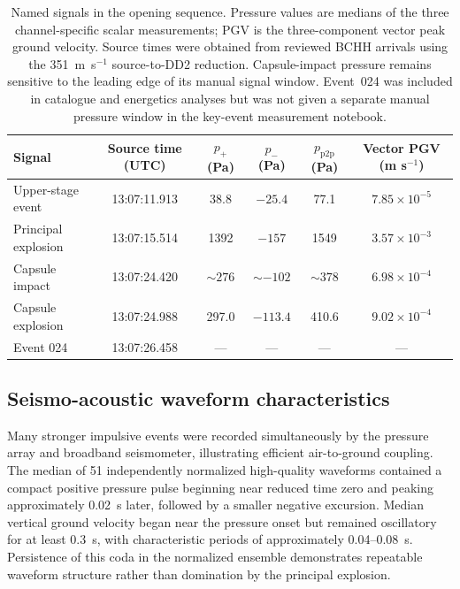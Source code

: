 \documentclass[]{seismica}
\begin{document}
\begin{table}[t]
\caption{Named signals in the opening sequence. Pressure values are medians of
the three channel-specific scalar measurements; PGV is the three-component
vector peak ground velocity. Source times were obtained from reviewed BCHH
arrivals using the 351~m~s$^{-1}$ source-to-DD2 reduction. Capsule-impact
pressure remains sensitive to the leading edge of its manual signal window.
Event~024 was included in catalogue and energetics analyses but was not given a
separate manual pressure window in the key-event measurement notebook.}
\label{tab:principal_events}
\centering
\small
\begin{tabular}{lccccc}
\hline
Signal & Source time (UTC) & $p_+$ (Pa) & $p_-$ (Pa) & $p_{\mathrm{p2p}}$ (Pa) & Vector PGV (m s$^{-1}$) \\
\hline
Upper-stage event & 13:07:11.913 & 38.8 & $-25.4$ & 77.1 & $7.85\times10^{-5}$ \\
Principal explosion & 13:07:15.514 & 1392 & $-157$ & 1549 & $3.57\times10^{-3}$ \\
Capsule impact & 13:07:24.420 & $\sim276$ & $\sim-102$ & $\sim378$ & $6.98\times10^{-4}$ \\
Capsule explosion & 13:07:24.988 & 297.0 & $-113.4$ & 410.6 & $9.02\times10^{-4}$ \\
Event 024 & 13:07:26.458 & --- & --- & --- & --- \\
\hline
\end{tabular}
\end{table}

\subsection{Seismo-acoustic waveform characteristics}
\label{sec:results_waveforms}

Many stronger impulsive events were recorded simultaneously by the pressure
array and broadband seismometer, illustrating efficient air-to-ground coupling.
The median of 51 independently normalized high-quality waveforms contained a
compact positive pressure pulse beginning near reduced time zero and peaking
approximately 0.02~s later, followed by a smaller negative excursion. Median
vertical ground velocity began near the pressure onset but remained oscillatory
for at least 0.3~s, with characteristic periods of approximately 0.04--0.08~s.
Persistence of this coda in the normalized ensemble demonstrates repeatable
waveform structure rather than domination by the principal explosion.
\end{document}
